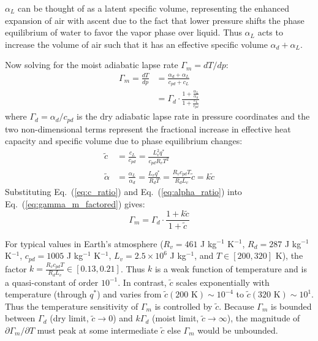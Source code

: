 \documentclass[draft]{ametsocV6.1}
\begin{document}
$\alpha_L$ can be thought of as a latent specific volume, representing the enhanced expansion of air with ascent due to the fact that lower pressure shifts the phase equilibrium of water to favor the vapor phase over liquid. Thus $\alpha_L$ acts to increase the volume of air such that it has an effective specific volume $\alpha_d + \alpha_L$.

Now solving for the moist adiabatic lapse rate $\Gamma_m = dT/dp$:
\begin{align}
\Gamma_m = \frac{dT}{dp} &= \frac{\alpha_d +\alpha_L}{c_{pd} + c_L} \label{eq:gamma_m_ratio} \\
&= \Gamma_d \cdot \frac{1+\frac{\alpha_L}{\alpha_d}}{1+\frac{c_L}{c_{pd}}} \label{eq:gamma_m_factored}
\end{align}
where $\Gamma_d = \alpha_d / c_{pd}$ is the dry adiabatic lapse rate in pressure coordinates and the two non-dimensional terms represent the fractional increase in effective heat capacity and specific volume due to phase equilibrium changes:
\begin{align}
\tilde{c} &= \frac{c_L}{c_{pd}} = \frac{L_v^2 q^*}{c_{pd} R_v T^2} \label{eq:c_ratio} \\
\tilde{\alpha} &= \frac{\alpha_L}{\alpha_d} = \frac{L_v q^*}{R_d T} = \frac{R_v c_{pd}T}{R_dL_v}\tilde{c} = k\tilde{c} \label{eq:alpha_ratio}
\end{align}
Substituting Eq.~(\ref{eq:c_ratio}) and Eq.~(\ref{eq:alpha_ratio}) into Eq.~(\ref{eq:gamma_m_factored}) gives:
\begin{equation}
\Gamma_m = \Gamma_d \cdot \frac{1 + k\tilde{c}}{1 + \tilde{c}} \label{eq:gamma_m_tilde}
\end{equation}

For typical values in Earth's atmosphere ($R_v=461$ J kg$^{-1}$ K$^{-1}$, $R_d=287$ J kg$^{-1}$ K$^{-1}$, $c_{pd}=1005$ J kg$^{-1}$ K$^{-1}$, $L_v=2.5\times10^6$ J kg$^{-1}$, and $T \in [200, 320]$ K), the factor $k=\frac{R_v c_{pd}T}{R_dL_v}\in [0.13, 0.21]$. Thus $k$ is a weak function of temperature and is a quasi-constant of order $10^{-1}$. In contrast, $\tilde{c}$ scales exponentially with temperature (through $q^*$) and varies from $\tilde{c}(200\text{ K})\sim 10^{-4}$ to $\tilde{c}(320\text{ K})\sim 10^{1}$. Thus the temperature sensitivity of $\Gamma_m$ is controlled by $\tilde{c}$. Because $\Gamma_m$ is bounded between $\Gamma_d$ (dry limit, $\tilde{c} \to 0$) and $k\Gamma_d$ (moist limit, $\tilde{c} \to \infty$), the magnitude of $\partial\Gamma_m/\partial T$ must peak at some intermediate $\tilde{c}$ else $\Gamma_m$ would be unbounded.
\end{document}
